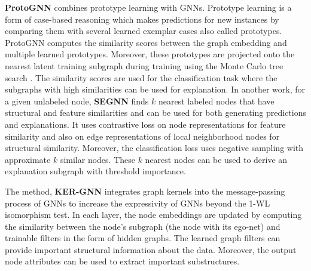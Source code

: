 

\textbf{ProtoGNN} \cite{protgnn} combines prototype learning \cite{prototype-learning} with GNNs. Prototype learning is a form of case-based reasoning which makes predictions for new instances by comparing them with several learned exemplar cases also called prototypes. ProtoGNN computes the similarity scores between the graph embedding and multiple learned prototypes. Moreover, these prototypes are projected onto the nearest latent training subgraph during training using the Monte Carlo tree search \cite{monte-carlo,monte-carlo-survey}. The similarity scores are used for the classification task where the subgraphs with high similarities can be used for explanation. In another work, for a given unlabeled node, \textbf{SEGNN} \cite{SE-GNN} finds $k$ nearest labeled nodes that have structural and feature similarities and can be used for both generating predictions and explanations. It uses contrastive loss on node representations for feature similarity and also on edge representations of local neighborhood nodes for structural similarity. Moreover, the classification loss uses negative sampling with approximate $k$ similar nodes. These $k$ nearest nodes can be used to derive an explanation subgraph with threshold importance.

The method, \textbf{KER-GNN} \cite{kergnns} integrates graph kernels into the message-passing process of GNNs to increase the expressivity of GNNs beyond the 1-WL isomorphism test. In each layer, the node embeddings are updated by computing the similarity between the node's subgraph (the node with its ego-net) and trainable filters in the form of hidden graphs. The learned graph filters can provide important structural information about the data. Moreover, the output node attributes can be used to extract important substructures.


